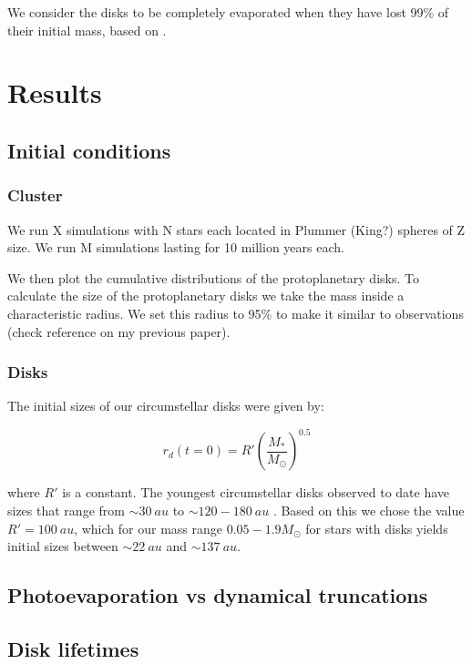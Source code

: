 \documentclass[fleqn,usenatbib]{mnras}
\begin{document}
We consider the disks to be completely evaporated when they have lost 99\% of their initial mass, based on \citet{anderson2013}.

\section{Results}
\label{sec:results}

\subsection{Initial conditions}
\subsubsection{Cluster}
We run X simulations with N stars each located in Plummer (King?) spheres of Z size. We run M simulations lasting for 10 million years each. 

We then plot the cumulative distributions of the protoplanetary disks. To calculate the size of the protoplanetary disks we take the mass inside a characteristic radius. We set this radius to 95\% to make it similar to observations (check reference on my previous paper).

\subsubsection{Disks}\label{initdisks}
The initial sizes of our circumstellar disks were given by:

\begin{equation}
r_d(t=0) = R'\left(\frac{M_*}{M_\odot}\right)^{0.5}
\end{equation}

\noindent
where $R'$ is a constant. The youngest circumstellar disks observed to date have sizes that range from $\sim\SI{30}{au}$ \citep[e.g.][]{lee2018} to $\sim120-\SI{180}{au}$ \citep[e.g.][]{murillo2013,vanthoff2018}. Based on this we chose the value $R' = \SI{100}{au}$, which for our mass range $0.05-1.9 M_\odot$ for stars with disks yields initial sizes between $\sim\SI{22}{au}$ and $\sim\SI{137}{au}$.

\subsection{Photoevaporation vs dynamical truncations}

\subsection{Disk lifetimes}
\end{document}
